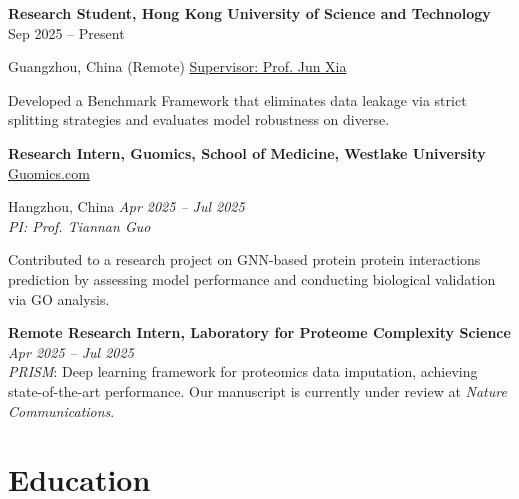 \documentclass[10pt, letterpaper]{article}
\begin{document}
\textbf{Research Student, Hong Kong University of Science and Technology}
\hfill {Sep 2025 – Present} \\[-0.5em]

\vspace{0.25 cm}

Guangzhou, China (Remote) \hfill \href{https://junxia97.github.io}{Supervisor: Prof. Jun Xia} \\


\vspace{0.10 cm}

Developed a Benchmark Framework that eliminates data leakage via strict splitting strategies and evaluates model robustness on diverse.





\vspace{0.2 cm}

\textbf{Research Intern, Guomics, School of Medicine, Westlake University}
\hfill \href{https://guomics.com/zh/}{Guomics.com} \\[-0.5em]

\vspace{0.25 cm}

Hangzhou, China \hfill \textit{Apr 2025 – Jul 2025} \\
\vspace{0.1 cm}
\textit{PI: Prof. Tiannan Guo} \\

\vspace{0.10 cm}

Contributed to a research project on GNN-based protein protein interactions prediction by assessing model performance and conducting biological validation via GO analysis.


\vspace{0.2 cm}

\textbf{Remote Research Intern, Laboratory for Proteome Complexity Science}   \hfill \textit{Apr 2025 – Jul 2025} \\
\vspace{0.1 cm}
\textit{PRISM}: Deep learning framework for proteomics data imputation, achieving state-of-the-art performance. Our manuscript is currently under review at \textit{Nature Communications}.



\vspace{0.10 cm}





    \section{Education}
\end{document}
